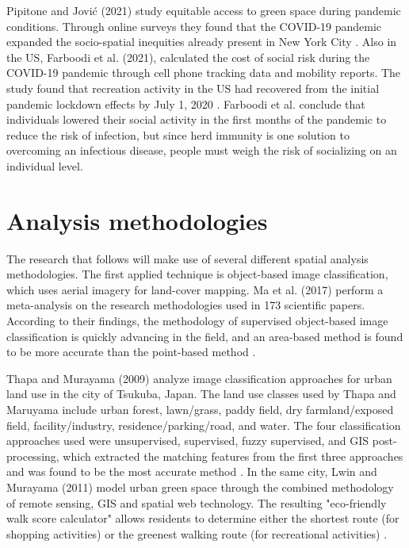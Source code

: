 \begin{multicols}{2}
Pipitone and Jović (2021) study equitable access to green space during pandemic conditions. Through online surveys they found that the COVID-19 pandemic expanded the socio-spatial inequities already present in New York City \cite{pipitone_urban_2021}. Also in the US, Farboodi et al. (2021), calculated the cost of social risk during the COVID-19 pandemic through cell phone tracking data and mobility reports. The study found that recreation activity in the US had recovered from the initial pandemic lockdown effects by July 1, 2020 \cite{farboodi_internal_2021}. Farboodi et al. conclude that individuals lowered their social activity in the first months of the pandemic to reduce the risk of infection, but since herd immunity is one solution to overcoming an infectious disease, people must weigh the risk of socializing on an individual level. 

\section{Analysis methodologies}
The research that follows will make use of several different spatial analysis methodologies. The first applied technique is object-based image classification, which uses aerial imagery for land-cover mapping. Ma et al. (2017) perform a meta-analysis on the research methodologies used in 173 scientific papers. According to their findings, the methodology of supervised object-based image classification is quickly advancing in the field, and an area-based method is found to be more accurate than the point-based method \cite{ma_review_2017}. 

Thapa and Murayama (2009) analyze image classification approaches for urban land use in the city of Tsukuba, Japan. The land use classes used by Thapa and Maruyama include urban forest, lawn/grass, paddy field, dry farmland/exposed field, facility/industry, residence/parking/road, and water. The four classification approaches used were unsupervised, supervised, fuzzy supervised, and GIS post-processing, which extracted the matching features from the first three approaches and was found to be the most accurate method \cite{thapa_urban_2009}. In the same city, Lwin and Murayama (2011) model urban green space through the combined methodology of remote sensing, GIS and spatial web technology. The resulting "eco-friendly walk score calculator" allows residents to determine either the shortest route (for shopping activities) or the greenest walking route (for recreational activities) \cite{lwin_modelling_2011}. 


\end{multicols}
